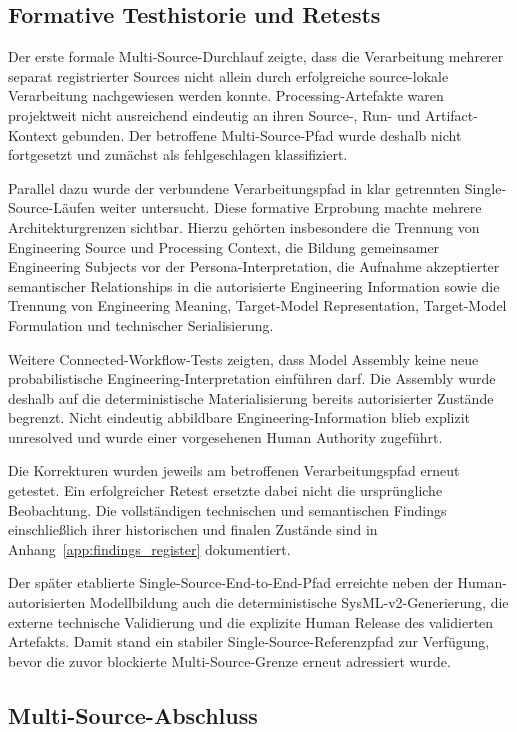 \subsection{Formative Testhistorie und Retests}

Der erste formale Multi-Source-Durchlauf zeigte, dass die Verarbeitung
mehrerer separat registrierter Sources nicht allein durch erfolgreiche
source-lokale Verarbeitung nachgewiesen werden konnte. Processing-Artefakte
waren projektweit nicht ausreichend eindeutig an ihren Source-, Run- und
Artifact-Kontext gebunden. Der betroffene Multi-Source-Pfad wurde deshalb
nicht fortgesetzt und zunächst als fehlgeschlagen klassifiziert.

Parallel dazu wurde der verbundene Verarbeitungspfad in klar getrennten
Single-Source-Läufen weiter untersucht. Diese formative Erprobung machte
mehrere Architekturgrenzen sichtbar. Hierzu gehörten insbesondere die
Trennung von Engineering Source und Processing Context, die Bildung
gemeinsamer Engineering Subjects vor der Persona-Interpretation, die
Aufnahme akzeptierter semantischer Relationships in die autorisierte
Engineering Information sowie die Trennung von Engineering Meaning,
Target-Model Representation, Target-Model Formulation und technischer
Serialisierung.

Weitere Connected-Workflow-Tests zeigten, dass Model Assembly keine neue
probabilistische Engineering-Interpretation einführen darf. Die Assembly
wurde deshalb auf die deterministische Materialisierung bereits
autorisierter Zustände begrenzt. Nicht eindeutig abbildbare
Engineering-Information blieb explizit unresolved und wurde einer
vorgesehenen Human Authority zugeführt.

Die Korrekturen wurden jeweils am betroffenen Verarbeitungspfad erneut
getestet. Ein erfolgreicher Retest ersetzte dabei nicht die ursprüngliche
Beobachtung. Die vollständigen technischen und semantischen Findings
einschließlich ihrer historischen und finalen Zustände sind in
Anhang~\ref{app:findings_register} dokumentiert.

Der später etablierte Single-Source-End-to-End-Pfad erreichte neben der
Human-autorisierten Modellbildung auch die deterministische
SysML-v2-Generierung, die externe technische Validierung und die explizite
Human Release des validierten Artefakts. Damit stand ein stabiler
Single-Source-Referenzpfad zur Verfügung, bevor die zuvor blockierte
Multi-Source-Grenze erneut adressiert wurde.

\subsection{Multi-Source-Abschluss}

